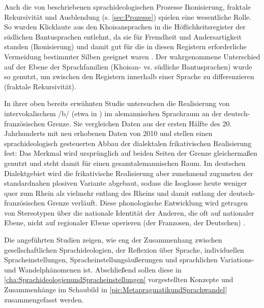 Auch die von \citet{Irvine2000} beschriebenen sprachideologischen Prozesse Ikonisierung, fraktale Rekursivität und Ausblendung (s. \autoref{sec:Prozesse}) spielen eine wesentliche Rolle. 
So wurden Klicklaute aus den Khoisansprachen in die Höflichkeitsregister der südlichen Bantusprachen entlehnt, da sie für Fremdheit und Andersartigkeit standen (Ikonisierung) und damit gut für die in diesen Registern erforderliche Vermeidung bestimmter Silben geeignet waren \citep[s.][42--43]{Irvine2000}. 
Der wahrgenommene Unterschied auf der Ebene der Sprachfamilien (Khoisan- vs. südliche Bantusprachen) wurde so genutzt, um zwischen den Registern innerhalb einer Sprache zu differenzieren (fraktale Rekursivität).

In ihrer oben bereits erwähnten Studie untersuchen \citet{Auer.2017} die Realisierung von intervokalischem /b/ (etwa in ) im alemannischen Sprachraum an der deutsch-französischen Grenze. 
Sie vergleichen Daten aus der ersten Hälfte des 20. Jahrhunderts mit neu erhobenen Daten von 2010 und stellen einen sprachideologisch gesteuerten Abbau der dialektalen frikativischen Realisierung fest:
Das Merkmal wird ursprünglich auf beiden Seiten der Grenze gleichermaßen genutzt und steht damit für einen gesamtalemannischen Raum. 
Im deutschen Dialektgebiet wird die frikativische Realisierung aber zunehmend zugunsten der standardnahen plosiven Variante abgebaut, sodass die Isoglosse heute weniger quer zum Rhein als vielmehr entlang des Rheins und damit entlang der deutsch-französischen Grenze verläuft. 
Diese phonologische Entwicklung wird getragen von \glqq Stereotypen über die nationale Identität der \glq Anderen\grq, die oft auf nationaler Ebene, nicht auf regionaler Ebene operieren (\glq der Franzosen\grq, \glq der Deutschen\grq)\grqq{} \citep[41]{Auer.2017}. %

Die angeführten Studien zeigen, wie eng der Zusammenhang zwischen gesellschaftlichen Sprachideologien, der Reflexion über Sprache, individuellen Spracheinstellungen, Spracheinstellungsäußerungen und sprachlichen Variations- und Wandelphänomenen ist. 
Abschließend sollen diese in \autoref{cha:SprachideologienundSpracheinstellungen} vorgestellten Konzepte und Zusammenhänge im Schaubild in \autoref{pic:MetapragmatikundSprachwandel} zusammengefasst werden.

